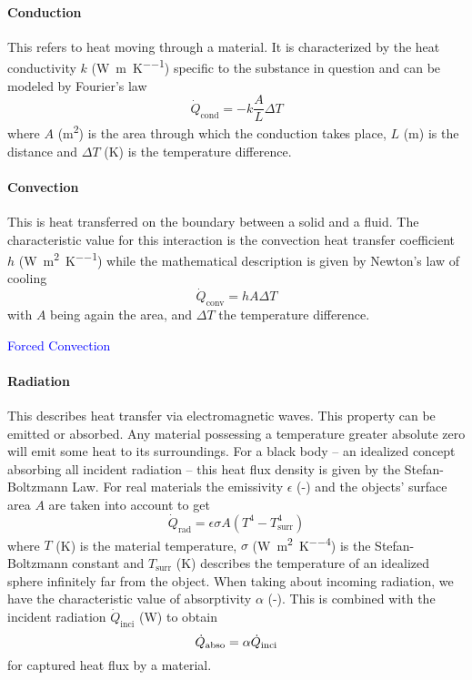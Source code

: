 \paragraph{Conduction} This refers to heat moving through a material.
It is characterized by the heat conductivity $k$ (\si{\W\per\m\per\K}) specific to the substance in question and can be modeled by Fourier's law
$$
\dot{Q}_{\text{cond}} = -k \frac{A}{L} \Delta T
$$
where $A$ (\si{\square\m}) is the area through which the conduction takes place, $L$ (\si{\m}) is the distance and $\Delta T$ (\si{\K}) is the temperature difference.

\paragraph{Convection} This is heat transferred on the boundary between a solid and a fluid.
The characteristic value for this interaction is the convection heat transfer coefficient $h$ (\si{\W\per\square\m\per\K}) while the mathematical description is given by Newton's law of cooling
$$
\dot{Q}_{\text{conv}} = h A \Delta T
$$
with $A$ being again the area, and $\Delta T$ the temperature difference.

\textcolor{Blue}{Forced Convection}

\paragraph{Radiation} This describes heat transfer via electromagnetic waves.
This property can be emitted or absorbed.
Any material possessing a temperature greater absolute zero will emit some heat to its surroundings.
For a black body -- an idealized concept absorbing all incident radiation -- this heat flux density is given by the Stefan-Boltzmann Law.
For real materials the emissivity $\epsilon$ (-) and the objects' surface area $A$ are taken into account to get
$$
\dot{Q}_{\text{rad}} = \epsilon \sigma A (T^4 - T_{\text{surr}}^4)
$$
where $T$ (\si{\K}) is the material temperature, $\sigma$ (\si{\W\per\square\m\per\K\tothe{4}}) is the Stefan-Boltzmann constant and $T_{\text{surr}}$ (\si{\K}) describes the temperature of an idealized sphere infinitely far from the object.
When taking about incoming radiation, we have the characteristic value of absorptivity $\alpha$ (-).
This is combined with the incident radiation $\dot{Q}_{\text{inci}}$ (\si{\W}) to obtain 
$$
\dot{Q}_{\text{abso}} = \alpha \dot{Q}_{\text{\text{inci}}} 
$$
for captured heat flux by a material.

